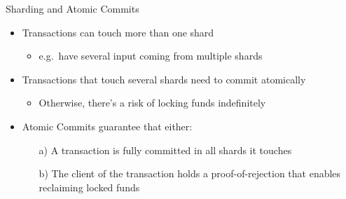 \begin{frame}{Sharding and Atomic Commits}
    \begin{itemize}
        \item Transactions can touch more than one shard
            \begin{itemize}
                \item e.g.\ have several input coming from multiple shards
            \end{itemize}
        \item Transactions that touch several shards need to commit atomically
            \begin{itemize}
                \item Otherwise, there's a risk of locking funds indefinitely
            \end{itemize}
        \item Atomic Commits guarantee that either:
            \begin{itemize}
                \item[a)] A transaction is fully committed in all shards it touches
                \item[b)] The client of the transaction holds a proof-of-rejection that enables reclaiming locked funds
            \end{itemize}
    \end{itemize}
\end{frame}
\note{
    \begin{itemize}
        \item
    \end{itemize}
}

